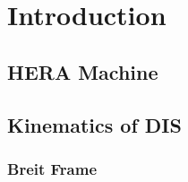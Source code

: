 \chapter{Introduction}
\label{chp:intro}

\section{HERA Machine}
\label{sec:hera}


\section{Kinematics of DIS}
\label{sec:kindis}


\subsection{Breit Frame}
\label{subsec:breitframe}

